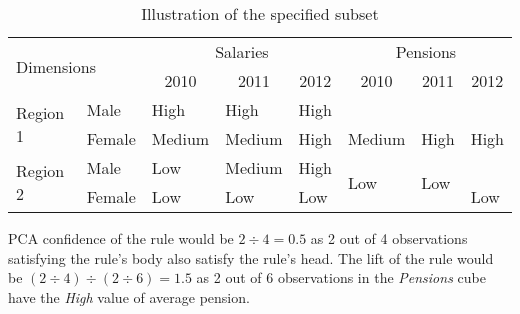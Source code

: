 \begin{table}[h]
\centering
\begin{tabular}{ll|lll|lll}
\multicolumn{2}{l|}{\multirow{2}{*}{Dimensions}} & \multicolumn{3}{c|}{Salaries}                                                   & \multicolumn{3}{c}{Pensions}                                                                                                                                                            \\
\multicolumn{2}{l|}{}                            & \multicolumn{1}{c}{2010} & \multicolumn{1}{c}{2011} & \multicolumn{1}{c|}{2012} & \multicolumn{1}{c}{2010}                                     & \multicolumn{1}{c}{2011}                                   & \multicolumn{1}{c}{2012}                                    \\ 
\hline
\multirow{2}{*}{Region 1} & Male                 & High                     & High                     & High                      & {\cellcolor[rgb]{0.753,0.753,0.753}}                         & {\cellcolor[rgb]{0.753,0.753,0.753}}                       & {\cellcolor[rgb]{0.753,0.753,0.753}}                        \\
                          & Female               & Medium                   & Medium                   & High                      & \multirow{-2}{*}{{\cellcolor[rgb]{0.753,0.753,0.753}}Medium} & \multirow{-2}{*}{{\cellcolor[rgb]{0.753,0.753,0.753}}High} & \multirow{-2}{*}{{\cellcolor[rgb]{0.753,0.753,0.753}}High}  \\
\multirow{2}{*}{Region 2} & Male                 & Low                      & Medium                   & High                      & \multirow{2}{*}{Low}                                         & \multirow{2}{*}{Low}                                       & {\cellcolor[rgb]{0.753,0.753,0.753}}                        \\
                          & Female               & Low                      & Low                      & Low                       &                                                              &                                                            & \multirow{-2}{*}{{\cellcolor[rgb]{0.753,0.753,0.753}}Low}  
\end{tabular}
\caption{Illustration of the specified subset}\label{table9}
\end{table}

PCA confidence of the rule would be $2 \div 4 = 0.5$ as 2 out of 4 observations satisfying the rule's body also satisfy the rule's head. The lift of the rule would be $(2 \div 4) \div (2 \div 6) = 1.5$ as 2 out of 6 observations in the \textit{Pensions} cube have the \textit{High} value of average pension.

